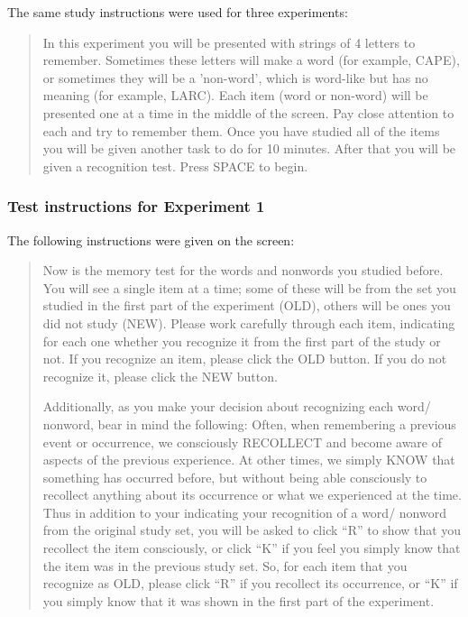 \documentclass[english,,man]{apa6}
\begin{document}
The same study instructions were used for three experiments:

\begin{quote}In this experiment you will be presented with strings of 4 letters to remember. Sometimes these letters will make a word (for example, CAPE), or sometimes they will be a 'non-word', which is word-like but has no meaning (for example, LARC). Each item (word or non-word) will be presented one at a time in the middle of the screen. Pay close attention to each and try to remember them. Once you have studied all of the items you will be given another task to do for 10 minutes. After that you will be given a recognition test. Press SPACE to begin.
\end{quote}

\hypertarget{test-instructions-for-experiment-1}{%
\subsubsection{Test instructions for Experiment 1}\label{test-instructions-for-experiment-1}}

The following instructions were given on the screen:

\begin{quote}Now is the memory test for the words and nonwords you studied before. You will
see a single item at a time; some of these will be from the set you studied in the first
part of the experiment (OLD), others will be ones you did not study (NEW). Please
work carefully through each item, indicating for each one whether you recognize it
from the first part of the study or not. If you recognize an item, please click the
OLD button. If you do not recognize it, please click the NEW button. 

Additionally, as you make your decision about recognizing each word/ nonword, bear
in mind the following: Often, when remembering a previous event or occurrence, we
consciously RECOLLECT and become aware of aspects of the previous experience. At
other times, we simply KNOW that something has occurred before, but without being
able consciously to recollect anything about its occurrence or what we experienced at
the time. 
Thus in addition to your indicating your recognition of a word/ nonword from the
original study set, you will be asked to click ``R” to show that you recollect the item
consciously, or click ``K” if you feel you simply know that the item was in the previous
study set. So, for each item that you recognize as OLD, please click ``R” if you
recollect its occurrence, or ``K” if you simply know that it was shown in the first part
of the experiment.
\end{quote}
\end{document}
